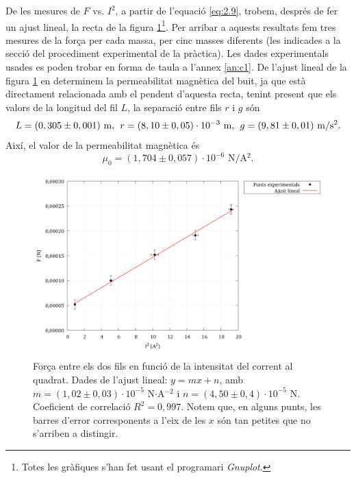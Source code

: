 \documentclass[a4paper,10.5pt]{report}
\begin{document}
De les mesures de $F$ vs. $I^2$, a partir de l'equació \eqref{eq:2.9}, trobem, després de fer un ajust lineal, la recta de la figura \ref{fig:2.3}\footnote{Totes les gràfiques s'han fet usant el programari \textit{Gnuplot}.}. Per arribar a aquests resultats fem tres mesures de la força per cada massa, per cinc masses diferents (les indicades a la secció del procediment experimental de la pràctica). Les dades experimentals usades es poden trobar en forma de taula a l'annex \ref{an:c1}. De l'ajust lineal de la figura \ref{fig:2.3} en determinem la permeabilitat magnètica del buit, ja que està directament relacionada amb el pendent d'aquesta recta, tenint present que els valors de la longitud del fil $L$, la separació entre fils $r$ i $g$ són
\begin{equation*}
	L = (0,305\pm 0,001)\text{ m}, \hspace{0.15cm} r = (8,10\pm 0,05)\cdot10^{-3} \text{ m}, \hspace{0.15cm} g = (9,81\pm 0,01) \text{ m/s$^2$}.
\end{equation*}
Així, el valor de la permeabilitat magnètica és
\begin{equation*}
	\mu_0 = (1,704\pm0,057)\cdot 10^{-6} \text{ N/A$^2$}.
\end{equation*}

\begin{figure}[h]
	\centering
	\includegraphics[width=0.8\linewidth]{screenshot016}
	\caption{Força entre els dos fils en funció de la intensitat del corrent al quadrat. Dades de l'ajust lineal: $y=mx+n$, amb $m = (1,02\pm0,03)\cdot 10^{-5}$ N$\cdot$A$^{-2}$ i $n = (4,50\pm0,4)\cdot 10^{-5}$ N. Coeficient de correlació $R^2=0,997$. Notem que, en alguns punts, les barres d'error corresponents a l'eix de les $x$ són tan petites que no s'arriben a distingir.}
	\label{fig:2.3}
\end{figure}
\end{document}
